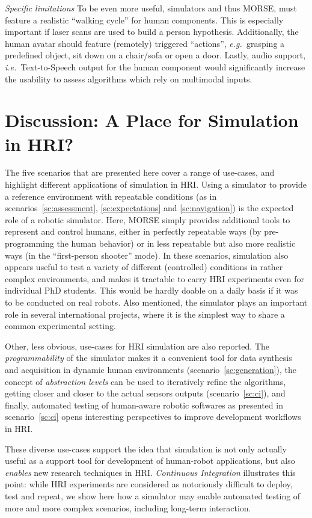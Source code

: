 \documentclass{llncs}
\newcommand{\eg}{{\textit{e.g.~}}}
\newcommand{\ie}{{\textit{i.e.~}}}
\begin{document}
\emph{Specific limitations} To be even more useful, simulators and thus MORSE, must
feature a realistic ``walking cycle'' for human components. This is especially
important if laser scans are used to build a person hypothesis. Additionally, the
human avatar should feature (remotely) triggered ``actions'', \eg grasping a 
predefined object, sit down on a chair/sofa or open a door. Lastly, audio support, 
\ie Text-to-Speech output for the human component would significantly increase
the usability to assess algorithms which rely on multimodal inputs.  

\section{Discussion: A Place for Simulation in HRI?}

The five scenarios that are presented here cover a range of use-cases, and
highlight different applications of simulation in HRI. Using a simulator to
provide a reference environment with repeatable conditions (as in
scenarios~\ref{sc:assessment}, \ref{sc:expectations} and \ref{sc:navigation}) is
the expected role of a robotic simulator. Here, MORSE simply provides additional
tools to represent and control humans, either in perfectly repeatable ways (by
pre-programming the human behavior) or in less repeatable but also more
realistic ways (in the ``first-person shooter'' mode).  In these scenarios,
simulation also appears useful to test a variety of different (controlled)
conditions in rather complex environments, and makes it tractable to carry HRI
experiments even for individual PhD students. This would be hardly doable on a
daily basis if it was to be conducted on real robots.  Also mentioned, the
simulator plays an important role in several international projects, where it is
the simplest way to share a common experimental setting.

Other, less obvious, use-cases for HRI simulation are also reported. The
\emph{programmability} of the simulator makes it a convenient tool for data
synthesis and acquisition in dynamic human environments
(scenario~\ref{sc:generation}), the concept of \emph{abstraction levels} can be
used to iteratively refine the algorithms, getting closer and closer to the
actual sensors outputs (scenario~\ref{sc:ci}), and finally, automated testing of
human-aware robotic softwares as presented in scenario~\ref{sc:ci} opens
interesting perspectives to improve development workflows in HRI.

These diverse use-cases support the idea that simulation is not only actually
useful as a support tool for development of human-robot applications, but also
\emph{enables} new research techniques in HRI. \emph{Continuous Integration}
illustrates this point: while HRI experiments are considered as notoriously
difficult to deploy, test and repeat, we show here how a simulator may enable
automated testing of more and more complex scenarios, including long-term
interaction.
\end{document}
